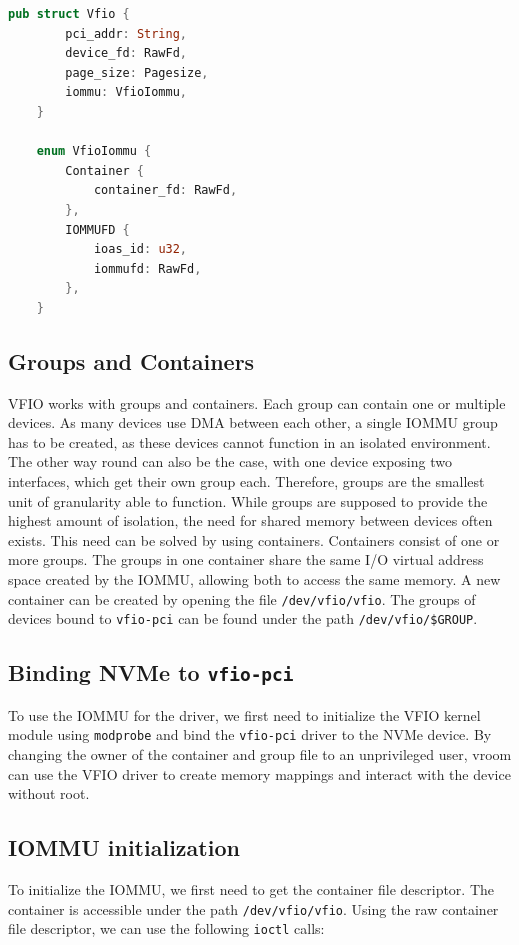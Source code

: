 \begin{lstlisting}[language=Rust,caption={Structs used to model VFIO}, label=lst:vfiostructs]
    pub struct Vfio {
        pci_addr: String,
        device_fd: RawFd,
        page_size: Pagesize,
        iommu: VfioIommu,
    }

    enum VfioIommu {
        Container {
            container_fd: RawFd,
        },
        IOMMUFD {
            ioas_id: u32,
            iommufd: RawFd,
        },
    }
\end{lstlisting}

\subsection{Groups and Containers}
VFIO works with groups and containers. Each group can contain one or multiple devices. As many devices use DMA between each other, a single IOMMU group has to be created, as these devices cannot function in an isolated environment. The other way round can also be the case, with one device exposing two interfaces, which get their own group each. Therefore, groups are the smallest unit of granularity able to function. While groups are supposed to provide the highest amount of isolation, the need for shared memory between devices often exists. This need can be solved by using containers. Containers consist of one or more groups. The groups in one container share the same I/O virtual address space created by the IOMMU, allowing both to access the same memory.
A new container can be created by opening the file \texttt{/dev/vfio/vfio}. The groups of devices bound to \texttt{vfio-pci} can be found under the path \texttt{/dev/vfio/\$GROUP}.

\subsection{Binding NVMe to \texttt{vfio-pci}}\label{sec:bindvfiopci}
To use the IOMMU for the driver, we first need to initialize the VFIO kernel module using \texttt{modprobe} and bind the \texttt{vfio-pci} driver to the NVMe device. By changing the owner of the container and group file to an unprivileged user, vroom can use the VFIO driver to create memory mappings and interact with the device without root.

\subsection{IOMMU initialization}\label{sec:iommuinit}
To initialize the IOMMU, we first need to get the container file descriptor. The container is accessible under the path \texttt{/dev/vfio/vfio}. Using the raw container file descriptor, we can use the following \texttt{ioctl} calls:

